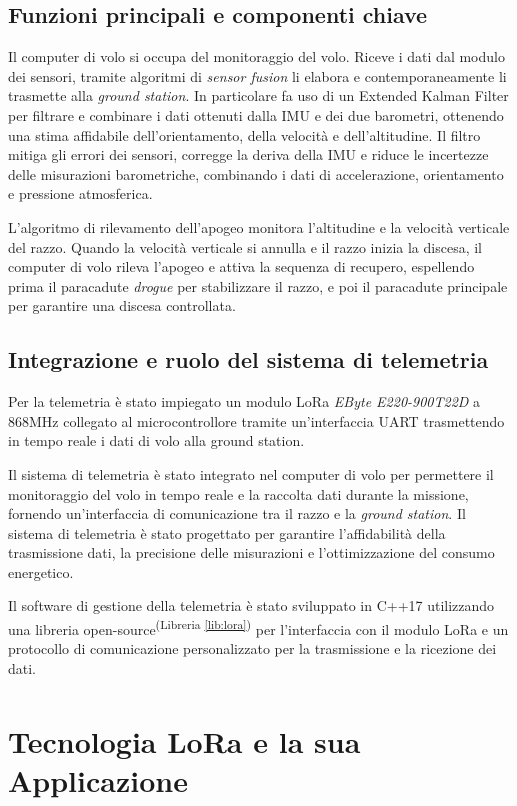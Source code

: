 \documentclass[12pt,a4paper,twoside]{book}
\newcommand{\libref}[1]{\textsuperscript{(Libreria \ref{#1})}}
\begin{document}
\section{Funzioni principali e componenti chiave}
Il computer di volo si occupa del monitoraggio del volo. Riceve i dati dal modulo
dei sensori, tramite algoritmi di \emph{sensor fusion} li elabora e
contemporaneamente li trasmette alla \emph{ground station}.
In particolare fa uso di un Extended Kalman Filter per filtrare e combinare i
dati ottenuti dalla \ac{IMU} e dei due barometri, ottenendo una stima
affidabile dell'orientamento, della velocità e dell'altitudine.
Il filtro mitiga gli errori dei sensori, corregge la deriva della \ac{IMU} e riduce
le incertezze delle misurazioni barometriche, combinando i dati di accelerazione,
orientamento e pressione atmosferica.

L'algoritmo di rilevamento dell'apogeo monitora l'altitudine e la velocità verticale
del razzo.
Quando la velocità verticale si annulla e il razzo inizia la discesa, il
computer di volo rileva l'apogeo e attiva la sequenza di recupero,
espellendo prima il paracadute \emph{drogue} per stabilizzare il razzo, e poi
il paracadute principale per garantire una discesa controllata.

\section{Integrazione e ruolo del sistema di telemetria}
Per la telemetria è stato impiegato un modulo \ac{LoRa} \emph{EByte E220-900T22D}
a 868MHz collegato al microcontrollore tramite un'interfaccia \ac{UART}
trasmettendo in tempo reale i dati di volo alla ground station.

Il sistema di telemetria è stato integrato nel computer di volo per permettere il
monitoraggio del volo in tempo reale e la raccolta dati durante la missione,
fornendo un'interfaccia di comunicazione tra il razzo e la \emph{ground station}.
Il sistema di telemetria è stato progettato per garantire l'affidabilità della
trasmissione dati, la precisione delle misurazioni e l'ottimizzazione del consumo
energetico.%

Il software di gestione della telemetria è stato sviluppato in C++17 utilizzando
una libreria open-source\libref{lib:lora} per l'interfaccia con il modulo \ac{LoRa}
e un protocollo di comunicazione personalizzato per la trasmissione e la
ricezione dei dati.

\chapter{Tecnologia \texorpdfstring{LoRa\textsuperscript{\textcopyright}}{} e la sua Applicazione} \label{chap:lora}
\end{document}
